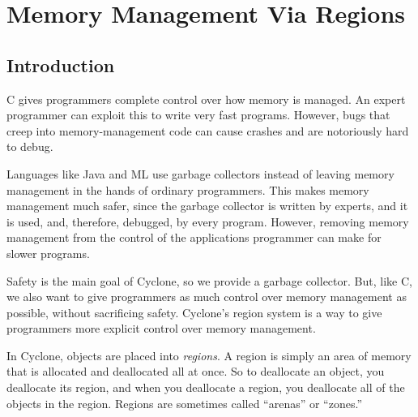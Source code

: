 \section{Memory Management Via Regions}
\label{sec:regions}


\subsection{Introduction}

C gives programmers complete control over how memory is managed.  An
expert programmer can exploit this to write very fast programs.
However, bugs that creep into memory-management code can cause
crashes and are notoriously hard to debug.

Languages like Java and ML use garbage collectors instead of leaving
memory management in the hands of ordinary programmers.  This makes
memory management much safer, since the garbage collector is written
by experts, and it is used, and, therefore, debugged, by every
program.  However, removing memory management from the control of the
applications programmer can make for slower programs.

Safety is the main goal of Cyclone, so we provide a garbage collector.
But, like C, we also want to give programmers as much control over
memory management as possible, without sacrificing safety.  Cyclone's
region system is a way to give programmers more explicit control over
memory management.

In Cyclone, objects are placed into \emph{regions}.  A region is
simply an area of memory that is allocated and deallocated all at
once.  So to deallocate an object, you deallocate its region, and
when you deallocate a region, you deallocate all of the objects in the
region.  Regions are sometimes called ``arenas'' or ``zones.''

